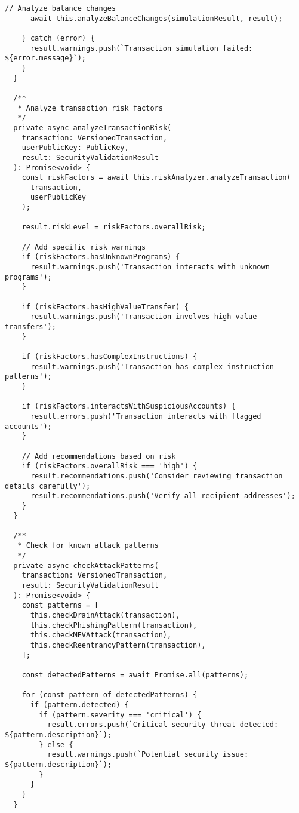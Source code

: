\documentclass[11pt,a4paper]{article}
\begin{document}
\begin{lstlisting}[style=typescript, caption=Comprehensive Transaction Security]
      // Analyze balance changes
      await this.analyzeBalanceChanges(simulationResult, result);

    } catch (error) {
      result.warnings.push(`Transaction simulation failed: ${error.message}`);
    }
  }

  /**
   * Analyze transaction risk factors
   */
  private async analyzeTransactionRisk(
    transaction: VersionedTransaction,
    userPublicKey: PublicKey,
    result: SecurityValidationResult
  ): Promise<void> {
    const riskFactors = await this.riskAnalyzer.analyzeTransaction(
      transaction,
      userPublicKey
    );

    result.riskLevel = riskFactors.overallRisk;

    // Add specific risk warnings
    if (riskFactors.hasUnknownPrograms) {
      result.warnings.push('Transaction interacts with unknown programs');
    }

    if (riskFactors.hasHighValueTransfer) {
      result.warnings.push('Transaction involves high-value transfers');
    }

    if (riskFactors.hasComplexInstructions) {
      result.warnings.push('Transaction has complex instruction patterns');
    }

    if (riskFactors.interactsWithSuspiciousAccounts) {
      result.errors.push('Transaction interacts with flagged accounts');
    }

    // Add recommendations based on risk
    if (riskFactors.overallRisk === 'high') {
      result.recommendations.push('Consider reviewing transaction details carefully');
      result.recommendations.push('Verify all recipient addresses');
    }
  }

  /**
   * Check for known attack patterns
   */
  private async checkAttackPatterns(
    transaction: VersionedTransaction,
    result: SecurityValidationResult
  ): Promise<void> {
    const patterns = [
      this.checkDrainAttack(transaction),
      this.checkPhishingPattern(transaction),
      this.checkMEVAttack(transaction),
      this.checkReentrancyPattern(transaction),
    ];

    const detectedPatterns = await Promise.all(patterns);
    
    for (const pattern of detectedPatterns) {
      if (pattern.detected) {
        if (pattern.severity === 'critical') {
          result.errors.push(`Critical security threat detected: ${pattern.description}`);
        } else {
          result.warnings.push(`Potential security issue: ${pattern.description}`);
        }
      }
    }
  }


\end{lstlisting}
\end{document}
